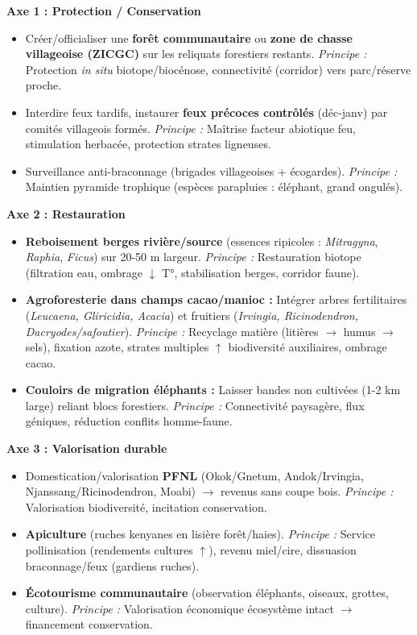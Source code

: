 \documentclass[11pt]{article}
\begin{document}
\begin{corrige}
\textbf{Axe 1 : Protection / Conservation}
\begin{itemize}
    \item Créer/officialiser une \textbf{forêt communautaire} ou \textbf{zone de chasse villageoise (ZICGC)} sur les reliquats forestiers restants. \emph{Principe :} Protection \emph{in situ} biotope/biocénose, connectivité (corridor) vers parc/réserve proche.
    \item Interdire feux tardifs, instaurer \textbf{feux précoces contrôlés} (déc-janv) par comités villageois formés. \emph{Principe :} Maîtrise facteur abiotique feu, stimulation herbacée, protection strates ligneuses.
    \item Surveillance anti-braconnage (brigades villageoises + écogardes). \emph{Principe :} Maintien pyramide trophique (espèces parapluies : éléphant, grand ongulés).
\end{itemize}
\textbf{Axe 2 : Restauration}
\begin{itemize}
    \item \textbf{Reboisement berges rivière/source} (essences ripicoles : \emph{Mitragyna}, \emph{Raphia}, \emph{Ficus}) sur 20-50 m largeur. \emph{Principe :} Restauration biotope (filtration eau, ombrage $\downarrow$ T°, stabilisation berges, corridor faune).
    \item \textbf{Agroforesterie dans champs cacao/manioc :} Intégrer arbres fertilitaires (\emph{Leucaena, Gliricidia, Acacia}) et fruitiers (\emph{Irvingia, Ricinodendron, Dacryodes/safoutier}). \emph{Principe :} Recyclage matière (litières $\to$ humus $\to$ sels), fixation azote, strates multiples $\uparrow$ biodiversité auxiliaires, ombrage cacao.
    \item \textbf{Couloirs de migration éléphants :} Laisser bandes non cultivées (1-2 km large) reliant blocs forestiers. \emph{Principe :} Connectivité paysagère, flux géniques, réduction conflits homme-faune.
\end{itemize}
\textbf{Axe 3 : Valorisation durable}
\begin{itemize}
    \item Domestication/valorisation \textbf{PFNL} (Okok/Gnetum, Andok/Irvingia, Njanssang/Ricinodendron, Moabi) $\to$ revenus sans coupe bois. \emph{Principe :} Valorisation biodiversité, incitation conservation.
    \item \textbf{Apiculture} (ruches kenyanes en lisière forêt/haies). \emph{Principe :} Service pollinisation (rendements cultures $\uparrow$), revenu miel/cire, dissuasion braconnage/feux (gardiens ruches).
    \item \textbf{Écotourisme communautaire} (observation éléphants, oiseaux, grottes, culture). \emph{Principe :} Valorisation économique écosystème intact $\to$ financement conservation.
\end{itemize}
\end{corrige}
\end{document}
